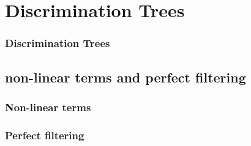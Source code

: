 
\section{Discrimination Trees}

\begin{frame}
	\frametitle{Discrimination Trees}
	
\end{frame}

\begin{frame}
	
\end{frame}

\subsection{non-linear terms and perfect filtering}

\begin{frame}
	\frametitle{Non-linear terms}
	
\end{frame}

\begin{frame}
	
\end{frame}

\begin{frame}
	\frametitle{Perfect filtering}
	
\end{frame}